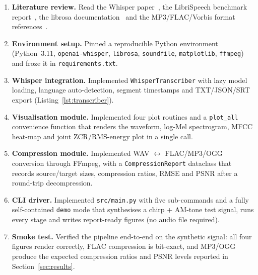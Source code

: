 \documentclass[conference]{IEEEtran}
\begin{document}
\begin{enumerate}
  \item \textbf{Literature review.}  Read the Whisper paper~\cite{radford2022whisper},
        the LibriSpeech benchmark report~\cite{panayotov2015librispeech},
        the librosa documentation~\cite{mcfee2015librosa} and the MP3/FLAC/Vorbis
        format references~\cite{brandenburg1999mp3,xiph2004vorbis,coalson2008flac}.
  \item \textbf{Environment setup.}  Pinned a reproducible Python
        environment (Python~3.11, \texttt{openai-whisper}, \texttt{librosa},
        \texttt{soundfile}, \texttt{matplotlib}, \texttt{ffmpeg}) and froze it
        in \texttt{requirements.txt}.
  \item \textbf{Whisper integration.}  Implemented
        \texttt{WhisperTranscriber} with lazy model loading, language
        auto-detection, segment timestamps and TXT/JSON/SRT export
        (Listing~\ref{lst:transcriber}).
  \item \textbf{Visualisation module.}  Implemented four plot routines and
        a \texttt{plot\_all} convenience function that renders the
        waveform, log-Mel spectrogram, MFCC heat-map and joint
        ZCR/RMS-energy plot in a single call.
  \item \textbf{Compression module.}  Implemented WAV $\leftrightarrow$
        FLAC/MP3/OGG conversion through FFmpeg, with a
        \texttt{CompressionReport} dataclass that records source/target
        sizes, compression ratios, RMSE and PSNR after a round-trip
        decompression.
  \item \textbf{CLI driver.}  Implemented \texttt{src/main.py} with five
        sub-commands and a fully self-contained \texttt{demo} mode that
        synthesises a chirp + AM-tone test signal, runs every stage and
        writes report-ready figures (no audio file required).
  \item \textbf{Smoke test.}  Verified the pipeline end-to-end on the
        synthetic signal: all four figures render correctly,
        FLAC compression is bit-exact, and MP3/OGG produce the expected
        compression ratios and PSNR levels reported in
        Section~\ref{sec:results}.
\end{enumerate}
\end{document}
